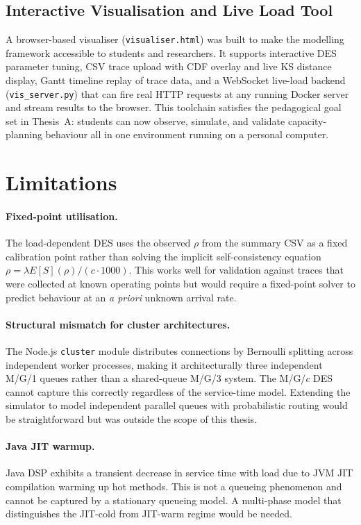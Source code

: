 \subsection{Interactive Visualisation and Live Load Tool}

A browser-based visualiser (\texttt{visualiser.html}) was built to make the modelling framework accessible to students and researchers. It supports interactive DES parameter tuning, CSV trace upload with CDF overlay and live KS distance display, Gantt timeline replay of trace data, and a WebSocket live-load backend (\texttt{vis\_server.py}) that can fire real HTTP requests at any running Docker server and stream results to the browser. This toolchain satisfies the pedagogical goal set in Thesis~A: students can now observe, simulate, and validate capacity-planning behaviour all in one environment running on a personal computer.

\section{Limitations}

\paragraph{Fixed-point utilisation.}
The load-dependent DES uses the observed $\rho$ from the summary CSV as a fixed calibration point rather than solving the implicit self-consistency equation $\rho = \lambda E[S](\rho)/(c \cdot 1000)$. This works well for validation against traces that were collected at known operating points but would require a fixed-point solver to predict behaviour at an \emph{a priori} unknown arrival rate.

\paragraph{Structural mismatch for cluster architectures.}
The Node.js \texttt{cluster} module distributes connections by Bernoulli splitting across independent worker processes, making it architecturally three independent M/G/1 queues rather than a shared-queue M/G/3 system. The M/G/$c$ DES cannot capture this correctly regardless of the service-time model. Extending the simulator to model independent parallel queues with probabilistic routing would be straightforward but was outside the scope of this thesis.

\paragraph{Java JIT warmup.}
Java DSP exhibits a transient decrease in service time with load due to JVM JIT compilation warming up hot methods. This is not a queueing phenomenon and cannot be captured by a stationary queueing model. A multi-phase model that distinguishes the JIT-cold from JIT-warm regime would be needed.

